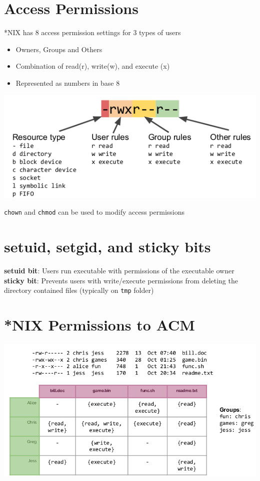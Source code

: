 \documentclass{article}[18pt]
\begin{document}
\section{Access Permissions}
*NIX has 8 access permission settings for 3 types of users
\begin{itemize}
	\item Owners, Groups and Others
	\item Combination of read(r), write(w), and execute (x)
	\item Represented as numbers in base 8
\end{itemize}
\begin{center}
	\includegraphics[scale=0.7]{permission}
\end{center}
\texttt{chown} and \texttt{chmod} can be used to modify access permissions
\section{setuid, setgid, and sticky bits}
\textbf{setuid bit}: Users run executable with permissions of the executable owner\\
\textbf{sticky bit}: Prevents users with write/execute permissions from deleting the directory contained files (typically on \texttt{tmp} folder)
\section{*NIX Permissions to ACM}
\begin{center}
	\includegraphics[scale=0.7]{permission1}
\end{center}
\end{document}
